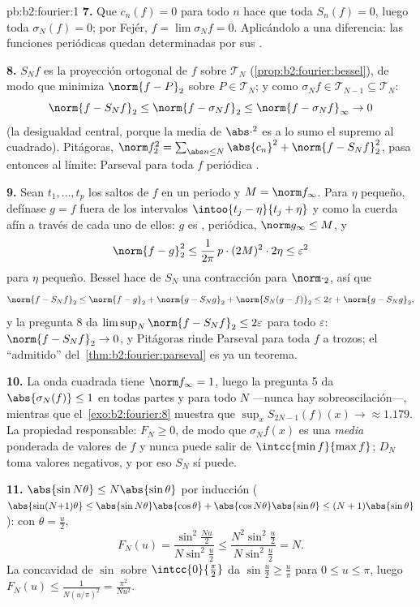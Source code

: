 \begin{solution}{pb:b2:fourier:1}
\textbf{7.} Que $c_n(f) = 0$ para todo $n$ hace que toda $S_n(f) =
0$, luego toda $\sigma_N(f) = 0$; por Fejér, $f = \lim\sigma_Nf =
0$. Aplicándolo a una diferencia: las funciones periódicas
 quedan determinadas por sus
.

\textbf{8.} $S_Nf$ es la proyección ortogonal de $f$ sobre $\mathcal
T_N$ (\cref{prop:b2:fourier:bessel}), de modo que minimiza $\norm{f -
P}_2$ sobre $P \in \mathcal T_N$; y como $\sigma_Nf \in \mathcal
T_{N-1} \subseteq \mathcal T_N$:
\[
\norm{f - S_Nf}_2 \leq \norm{f - \sigma_Nf}_2
\leq \norm{f - \sigma_Nf}_\infty \to 0
\]
(la desigualdad central, porque la media de $\abs\cdot^2$ es a lo
sumo el supremo al cuadrado). Pitágoras, $\norm f_2^2 = \sum_{\abs
n\leq N}\abs{c_n}^2 + \norm{f - S_Nf}_2^2$, pasa entonces al límite:
Parseval para toda $f$ periódica .

\textbf{9.} Sean $t_1, \dots, t_p$ los saltos de $f$ en un periodo y
$M = \norm f_\infty$. Para $\eta$ pequeño, defínase $g = f$ fuera de
los intervalos $\intoo{t_j - \eta}{t_j + \eta}$ y como la cuerda afín
a través de cada uno de ellos: $g$ es , periódica, $\norm
g_\infty \leq M$, y
\[
\norm{f - g}_2^2 \leq \frac{1}{2\pi}\,p\cdot(2M)^2\cdot2\eta
\leq \varepsilon^2
\]
para $\eta$ pequeño. Bessel hace de $S_N$ una contracción para
$\norm\cdot_2$, así que
\[
\norm{f - S_Nf}_2
\leq \norm{f - g}_2 + \norm{g - S_Ng}_2 + \norm{S_N(g -
f)}_2
\leq 2\varepsilon + \norm{g - S_Ng}_2 ,
\]
y la pregunta 8 da $\limsup_N\norm{f - S_Nf}_2 \leq 2\varepsilon$
para todo $\varepsilon$: $\norm{f - S_Nf}_2 \to 0$, y Pitágoras rinde
Parseval para toda $f$  a trozos; el ``admitido'' del~\cref{thm:b2:fourier:parseval} es ya un teorema.

\textbf{10.} La onda cuadrada tiene $\norm f_\infty = 1$, luego la
pregunta 5 da $\abs{\sigma_N(f)} \leq 1$ en todas partes y para todo
$N$ ---nunca hay sobreoscilación---, mientras que el~\cref{exo:b2:fourier:8} muestra que $\sup_xS_{2N-1}(f)(x) \to \approx
1.179$. La propiedad responsable: $F_N \geq 0$, de modo que
$\sigma_Nf(x)$ es una \emph{media} ponderada de valores de $f$ y
nunca puede salir de $\intcc{\min f}{\max f}$; $D_N$ toma valores
negativos, y por eso $S_N$ sí puede.

\textbf{11.} $\abs{\sin N\theta} \leq N\abs{\sin\theta}$ por
inducción ($\abs{\sin(N{+}1)\theta} \leq \abs{\sin
N\theta}\abs{\cos\theta} + \abs{\cos N\theta}\abs{\sin\theta} \leq
(N+1)\abs{\sin\theta}$): con $\theta = \frac u2$,
\[
F_N(u) = \frac{\sin^2\frac{Nu}2}{N\sin^2\frac u2}
\leq \frac{N^2\sin^2\frac u2}{N\sin^2\frac u2} = N .
\]
La concavidad de $\sin$ sobre $\intcc{0}{\frac\pi2}$ da $\sin\frac u2
\geq \frac{u}{\pi}$ para $0 \leq u \leq \pi$, luego $F_N(u) \leq
\frac{1}{N(u/\pi)^2} = \frac{\pi^2}{Nu^2}$.


\end{solution}
